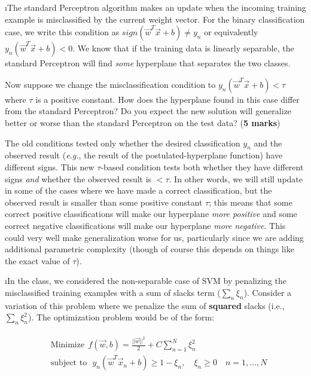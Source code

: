 \documentclass[fleqn]{article}
\begin{document}
\i The standard Perceptron algorithm makes an update when the incoming training example
is misclassified by the current weight vector. For the binary classification
case, we write this condition as $sign(\vec{w}^T\vec{x}+b) \neq y_n$ 
or equivalently $y_n(\vec{w}^T\vec{x}+b) < 0$. We know that if the training data
is linearly separable, the standard Perceptron will find \textit{some} hyperplane
that separates the two classes.

Now suppose we change the misclassification condition to $y_n(\vec{w}^T\vec{x}+b) 
<  \tau$ where $\tau$ is a positive constant. How does the hyperplane found
in this case differ from the standard Perceptron? Do you expect the 
new solution will generalize better or worse than the standard Perceptron on the 
test data? (\textbf{5 marks})

\begin{solution}
The old conditions tested only whether the desired classification $y_n$ and the observed result (\textit{e.g.}, the result of the postulated-hyperplane function) have different signs. This new $\tau$-based condition tests both whether they have different signs \textit{and} whether the observed result is $< \tau$. In other words, we will still update in some of the cases where we have made a correct classification, but the observed result is smaller than some positive constant $\tau$; this means that some correct positive classifications will make our hyperplane \textit{more positive} and some correct negative classifications will make our hyperplane \textit{more negative}. This could very well make generalization worse for us, particularly since we are adding additional parametric complexity (though of course this depends on things like the exact value of $\tau$).
\end{solution}

\i In the class, we considered the non-separable case of SVM by penalizing
the misclassified training examples with a sum of slacks term ($\sum_n \xi_n$).
Consider a variation of this problem where we penalize the sum of \textbf{squared} 
slacks (i.e., $\sum_n \xi_n^2$). The optimization problem would be of the form:

\begin{gather}
\begin{split}
&   	\text{Minimize} \ \ f(\vec{w},b) = \frac{||\vec{w}||^2}{2} + C \sum_{n=1}^N \xi_n^2 \nonumber 
\\
&    	\text{subject to}\ \ \  y_n(\vec{w}^T\vec{x}_n + b) \geq 1 - \xi_n,\quad \xi_n \geq 0 \quad n=1,\ldots,N \nonumber
\end{split}
\end{gather}
\end{document}

